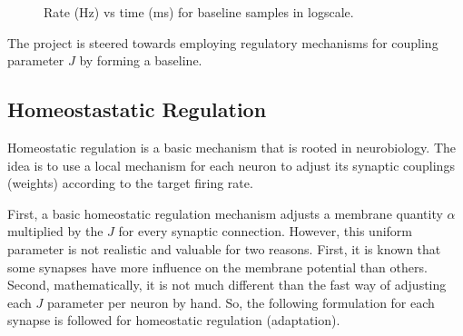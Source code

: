 \documentclass[a4paper,12pt]{article}
\begin{document}
\begin{figure}[htb!] 
    \caption{Rate (Hz) vs time (ms) for baseline samples in logscale.}
    \label{ratevstime}
\end{figure}

The project is steered towards employing regulatory mechanisms for coupling parameter $J$ by forming a baseline.


\subsection{Homeostastatic Regulation}
Homeostatic regulation is a basic mechanism that is rooted in neurobiology. The idea is to use a local mechanism for each neuron to adjust its synaptic couplings (weights) according to the target firing rate. 

First, a basic homeostatic regulation mechanism adjusts a membrane quantity $\alpha$ multiplied by the $J$ for every synaptic connection. However, this uniform parameter is not realistic and valuable for two reasons. First, it is known that some synapses have more influence on the membrane potential than others. Second, mathematically, it is not much different than the fast way of adjusting each $J$ parameter per neuron by hand. So, the following formulation for each synapse is followed for homeostatic regulation (adaptation). 
\end{document}
